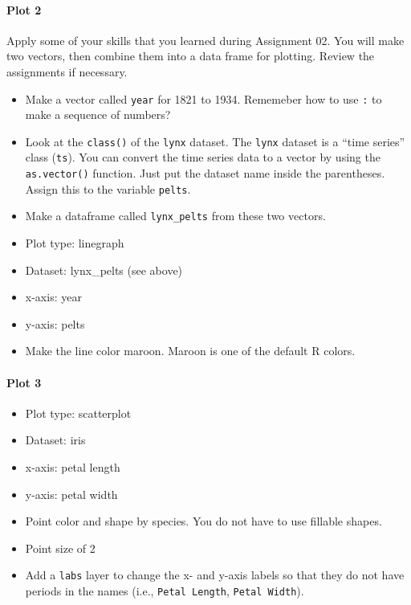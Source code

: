 \documentclass[]{article}
\providecommand{\tightlist}{%
  \setlength{\itemsep}{0pt}\setlength{\parskip}{0pt}}
\let\oldparagraph\paragraph
\renewcommand{\paragraph}[1]{\oldparagraph{#1}\mbox{}}
\begin{document}
\hypertarget{plot-2}{%
\paragraph{Plot 2}\label{plot-2}}

Apply some of your skills that you learned during Assignment 02. You
will make two vectors, then combine them into a data frame for plotting.
Review the assignments if necessary.

\begin{itemize}
\item
  Make a vector called \texttt{year} for 1821 to 1934. Rememeber how to
  use \texttt{:} to make a sequence of numbers?
\item
  Look at the \texttt{class()} of the \texttt{lynx} dataset. The
  \texttt{lynx} dataset is a ``time series'' class (\texttt{ts}). You
  can convert the time series data to a vector by using the
  \texttt{as.vector()} function. Just put the dataset name inside the
  parentheses. Assign this to the variable \texttt{pelts}.
\item
  Make a dataframe called \texttt{lynx\_pelts} from these two vectors.
\item
  Plot type: linegraph
\item
  Dataset: lynx\_pelts (see above)
\item
  x-axis: year
\item
  y-axis: pelts
\item
  Make the line color maroon. Maroon is one of the default R colors.
\end{itemize}

\hypertarget{plot-3}{%
\paragraph{Plot 3}\label{plot-3}}

\begin{itemize}
\tightlist
\item
  Plot type: scatterplot
\item
  Dataset: iris
\item
  x-axis: petal length
\item
  y-axis: petal width
\item
  Point color and shape by species. You do not have to use fillable
  shapes.
\item
  Point size of 2
\item
  Add a \texttt{labs} layer to change the x- and y-axis labels so that
  they do not have periods in the names (i.e., \texttt{Petal\ Length},
  \texttt{Petal\ Width}).
\end{itemize}
\end{document}
